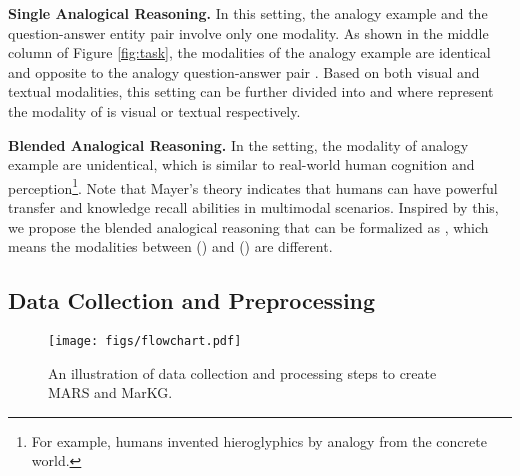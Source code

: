 \documentclass{article} \usepackage{iclr2023_conference,times}
\newcommand{\data}{MARS}
\newcommand{\kg}{MarKG}
\begin{document}
\textbf{Single Analogical Reasoning.}
In this setting, the analogy example and the question-answer entity pair involve only one modality.
As shown in the middle column of Figure \ref{fig:task},
the modalities of the analogy example  are identical and opposite to the analogy question-answer pair .
Based on both visual and textual modalities, this setting can be further divided into  and  where  represent the modality of  is visual or textual respectively.

\textbf{Blended Analogical Reasoning.}
In the setting, the modality of analogy example  are unidentical, which is similar to real-world human cognition and perception\footnote{For example, humans invented hieroglyphics by analogy from the concrete world.}.
Note that Mayer's theory indicates that humans can have powerful transfer and knowledge recall abilities in multimodal scenarios. 
Inspired by this, we propose the blended analogical reasoning that can be formalized as , which means the modalities between  () and  () are different.

\subsection{Data Collection and Preprocessing}
\label{sec:data_collect}

\begin{figure}[!t]
\centering
\texttt{[image: figs/flowchart.pdf]}
\caption{
An illustration of data collection and processing steps to create {\data} and {\kg}.}
\label{fig:flowchart}
\end{figure}
\end{document}
